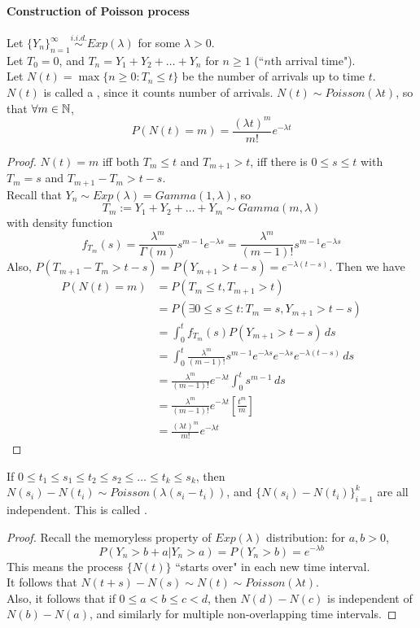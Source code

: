 \documentclass[11pt]{article}
\begin{document}
   	\paragraph{Construction of Poisson process}
   	Let $\{Y_n\}_{n=1}^\infty \overset{i.i.d.}{\sim} Exp(\lambda)$ for some $\lambda > 0$.\\
   	Let $T_0 = 0$, and $T_n = Y_1 + Y_2 + \hdots + Y_n$ for $n \geq 1$ (``$n$th arrival time").\\
   	Let $N(t) = \max\{n \geq 0: T_n \leq t\}$ be the number of arrivals up to time $t$.\\
   	 $N(t)$ is called a , since it counts number of arrivals.
   	\proposition $N(t) \sim Poisson(\lambda t)$, so that $\forall m \in \mathbb{N}$,
   	$$P(N(t) = m) = \frac{(\lambda t)^m}{m!}e^{-\lambda t}$$
   	\begin{proof}
   		$N(t) = m$ iff both $T_m \leq t$ and $T_{m+1} > t$, iff there is $0 \leq s \leq t$ with $T_m = s$ and $T_{m+1} - T_m > t-s$.\\
   		Recall that $Y_n \sim Exp(\lambda) = Gamma(1, \lambda)$, so 
   		$$T_m := Y_1 + Y_2 + \hdots + Y_m \sim Gamma(m, \lambda)$$
   		with density function
   		$$f_{T_m}(s) = \frac{\lambda^m}{\Gamma(m)}s^{m-1}e^{-\lambda s} = \frac{\lambda^m}{(m-1)!}s^{m-1}e^{-\lambda s}$$
   		Also, $P(T_{m+1} - T_m > t-s) = P(Y_{m+1} > t-s) = e^{-\lambda(t-s)}$. Then we have
   		\begin{align*}
   			P(N(t) = m) &= P(T_m \leq t, T_{m+1} > t) \\
   			&= P(\exists 0 \leq s \leq t: T_m = s, Y_{m+1} > t-s) \\
   			&= \int_0^t f_{T_m}(s) P(Y_{m+1} > t-s) \, ds \\
   			&= \int_0^t \frac{\lambda^m}{(m-1)!}s^{m-1}e^{-\lambda s}e^{-\lambda s}e^{-\lambda(t-s)}\, ds\\
   			&= \frac{\lambda^m}{(m-1)!}e^{-\lambda t}\int_0^t s^{m-1}\,ds \\
   			&= \frac{\lambda^m}{(m-1)!}e^{-\lambda t}[\frac{t^m}{m}]\\
   			&= \frac{(\lambda t)^m}{m!}e^{-\lambda t}
   		\end{align*}
   	\end{proof} 
   	\property
   	If $0 \leq t_1 \leq s_1 \leq t_2 \leq s_2 \leq \hdots \leq t_k \leq s_k$, then $N(s_i) - N(t_i) \sim Poisson(\lambda(s_i - t_i))$, and $\{N(s_i) - N(t_i)\}_{i=1}^k$ are all independent. This is called .
   	\begin{proof}
   		Recall the memoryless property of $Exp(\lambda)$ distribution: for $a, b >0$,
   		$$P(Y_n > b + a|Y_n > a) = P(Y_n > b) = e^{-\lambda b}$$
   		This means the process $\{N(t)\}$ ``starts over" in each new time interval. \\
   		It follows that $N(t+s) - N(s) \sim N(t) \sim Poisson(\lambda t)$.\\
   		Also, it follows that if $0 \leq a < b \leq c < d$, then $N(d) - N(c)$ is independent of $N(b) - N(a)$, and similarly for multiple non-overlapping time intervals.
   	\end{proof}
   	
\end{document}
